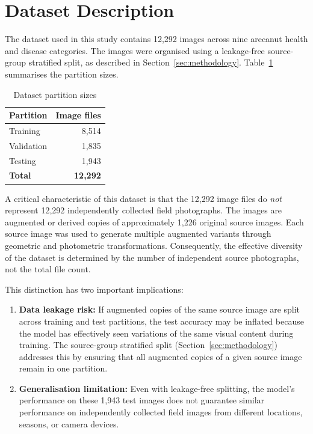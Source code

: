 \documentclass[conference]{IEEEtran}
\begin{document}
\section{Dataset Description}
\label{sec:dataset}

The dataset used in this study contains 12{,}292 images across nine arecanut health and disease categories. The images were organised using a leakage-free source-group stratified split, as described in Section~\ref{sec:methodology}. Table~\ref{tab:dataset} summarises the partition sizes.

\begin{table}[htbp]
\caption{Dataset partition sizes}
\label{tab:dataset}
\centering
\begin{tabular}{l|r}
\toprule
\textbf{Partition} & \textbf{Image files} \\
\midrule
Training       & 8{,}514 \\
Validation     & 1{,}835 \\
Testing        & 1{,}943 \\
\midrule
\textbf{Total} & \textbf{12{,}292} \\
\bottomrule
\end{tabular}
\end{table}

A critical characteristic of this dataset is that the 12{,}292 image files do \emph{not} represent 12{,}292 independently collected field photographs. The images are augmented or derived copies of approximately 1{,}226 original source images. Each source image was used to generate multiple augmented variants through geometric and photometric transformations. Consequently, the effective diversity of the dataset is determined by the number of independent source photographs, not the total file count.

This distinction has two important implications:
\begin{enumerate}
    \item \textbf{Data leakage risk:} If augmented copies of the same source image are split across training and test partitions, the test accuracy may be inflated because the model has effectively seen variations of the same visual content during training. The source-group stratified split (Section~\ref{sec:methodology}) addresses this by ensuring that all augmented copies of a given source image remain in one partition.
    \item \textbf{Generalisation limitation:} Even with leakage-free splitting, the model's performance on these 1{,}943 test images does not guarantee similar performance on independently collected field images from different locations, seasons, or camera devices.
\end{enumerate}
\end{document}
